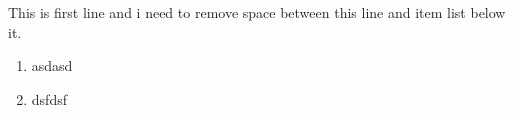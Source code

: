 \documentclass[11pt]{article}
\newcounter{mycounter}
\begin{document}
This is first line and i need to remove space between this line and
item list below it.
\begin{enumerate}[-,topsep=0pt]
\item asdasd
\item dsfdsf
\end{enumerate}






\end{document}
